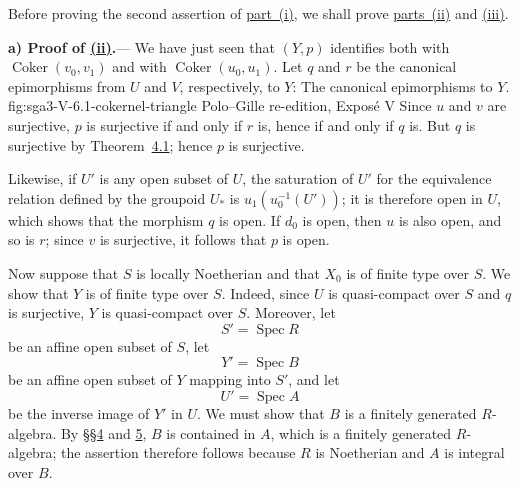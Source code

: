 Before proving the second assertion of \hyperref[lem:sga3-V-6.1-i]{part~(i)}, we shall prove
\hyperref[lem:sga3-V-6.1-ii]{parts~(ii)} and \hyperref[lem:sga3-V-6.1-iii]{(iii)}.

\medskip
{}\label{par:sga3-V-6-a}%
\noindent\textbf{a) Proof of \hyperref[lem:sga3-V-6.1-ii]{(ii)}.}---%
We have just seen that \((Y,p)\) identifies both with
\(\operatorname{Coker}(v_0,v_1)\) and with
\(\operatorname{Coker}(u_0,u_1)\). Let \(q\) and \(r\) be the
canonical epimorphisms from \(U\) and \(V\), respectively, to \(Y\):
  {The canonical epimorphisms to \(Y\).}
  {fig:sga3-V-6.1-cokernel-triangle}
  {Polo--Gille re-edition, Expos\'e V}
Since \(u\) and \(v\) are surjective, \(p\) is surjective if and only if
\(r\) is, hence if and only if \(q\) is. But \(q\) is surjective by
Theorem~\hyperref[thm:sga3-V-4.1]{4.1}; hence \(p\) is surjective.

Likewise, if \(U'\) is any open subset of \(U\), the saturation of \(U'\) for
the equivalence relation defined by the groupoid \(U_\ast\) is
\(u_1(u_0^{-1}(U'))\); it is therefore open in \(U\), which shows that the
morphism \(q\) is open. If \(d_0\) is open, then \(u\) is also open, and so is
\(r\); since \(v\) is surjective, it follows that \(p\) is open.

Now suppose that \(S\) is locally Noetherian and that \(X_0\) is of finite
type over \(S\). We show that \(Y\) is of finite type over \(S\). Indeed, since
\(U\) is quasi-compact over \(S\) and \(q\) is surjective, \(Y\) is
quasi-compact over \(S\). Moreover, let
\[
  S'=\operatorname{Spec}R
\]
be an affine open subset of \(S\), let
\[
  Y'=\operatorname{Spec}B
\]
be an affine open subset of \(Y\) mapping into \(S'\), and let
\[
  U'=\operatorname{Spec}A
\]
be the inverse image of \(Y'\) in \(U\). We must show that \(B\) is a finitely
generated \(R\)-algebra. By \hyperref[sec:sga3-V-4]{\S\S4} and \hyperref[sec:sga3-V-5]{5}, \(B\) is contained in \(A\), which is
a finitely generated \(R\)-algebra; the assertion therefore follows
because \(R\) is Noetherian and \(A\) is integral over \(B\).
